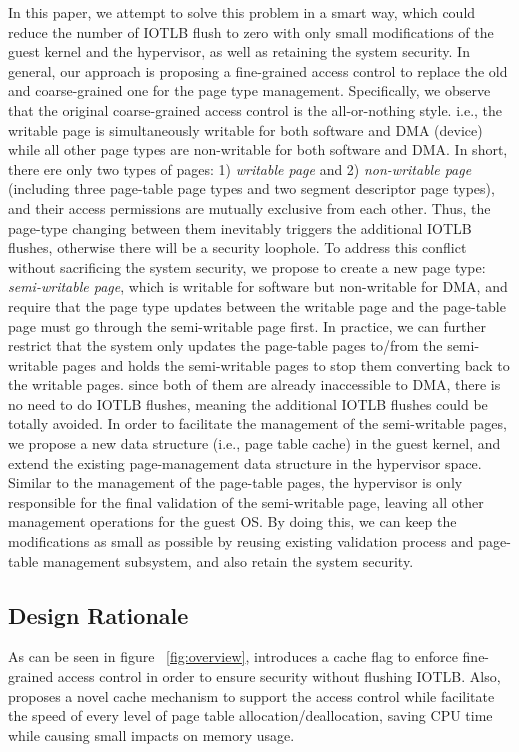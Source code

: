 In this paper, we attempt to solve this problem in a smart way, which could reduce the number of IOTLB flush to zero with only small modifications of the guest kernel and the hypervisor, 
as well as retaining the system security.
In general, our approach is proposing a fine-grained access control to replace the old and coarse-grained one for the page type management.
Specifically, we observe that the original coarse-grained access control is the all-or-nothing style. i.e., the writable page is simultaneously writable for both software and DMA (device) while all other page types are non-writable for both software and DMA.
In short, there ere only two types of pages: 1) \emph{writable page} and 2) \emph{non-writable page} (including three page-table page types and two segment descriptor page types), and their access permissions are mutually exclusive from each other.
Thus, the page-type changing between them inevitably triggers the additional IOTLB flushes, otherwise there will be a security loophole.
To address this conflict without sacrificing the system security, we propose to create a new page type: \emph{semi-writable page}, which is writable for software but non-writable for DMA,
and require that the page type updates between the writable page and the page-table page must go through the semi-writable page first.
In practice,  we can further restrict that the system only updates the page-table pages to/from the semi-writable pages and holds the semi-writable pages to stop them converting back to the writable pages.
since both of them are already inaccessible to DMA, there is no need to do IOTLB flushes, meaning the additional IOTLB flushes could be totally avoided.
In order to facilitate the management of the semi-writable pages, we propose a new data structure (i.e., page table cache) in the guest kernel, and extend the existing page-management data structure in the hypervisor space.
Similar to the management of the page-table pages, the hypervisor is only responsible for the final validation of the semi-writable page, leaving all other management operations for the guest OS.
By doing this, we can keep the modifications as small as possible by reusing existing validation process and page-table management subsystem, and also retain the system security.


\subsection{Design Rationale}
As can be seen in figure ~\ref{fig:overview}, \name introduces a cache flag to enforce fine-grained access control in order to ensure security without flushing IOTLB. Also, \name proposes a novel cache mechanism to support the access control while facilitate the speed of every level of page table allocation/deallocation, saving CPU time while causing small impacts on memory usage.

